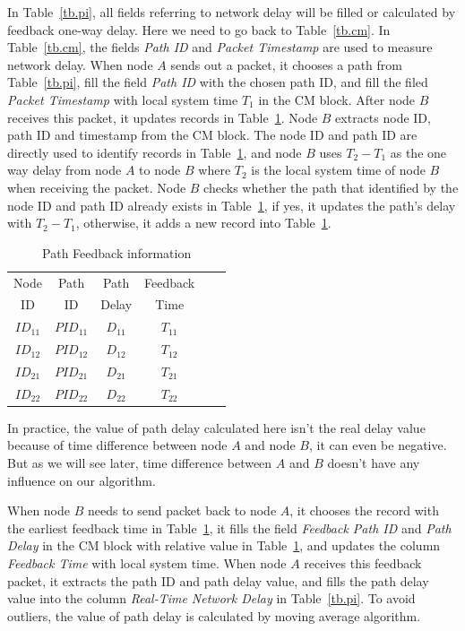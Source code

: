 In Table~\ref{tb.pi}, all fields referring to network delay will be filled or calculated by feedback one-way delay. Here we need to go back to Table~\ref{tb.cm}. In Table~\ref{tb.cm}, the fields \emph{Path ID} and \emph{Packet Timestamp} are used to measure network delay. When node $A$ sends out a packet, it chooses a path from Table~\ref{tb.pi}, fill the field \emph{Path ID} with the chosen path ID, and fill the filed \emph{Packet Timestamp} with local system time $T_1$ in the CM block. After node $B$ receives this packet, it updates records in Table~\ref{tb.ps}. Node $B$ extracts node ID, path ID and timestamp from the CM block. The node ID and path ID are directly used to identify records in Table~\ref{tb.ps}, and node $B$ uses $T_2-T_1$ as the one way delay from node $A$ to node $B$ where $T_2$ is the local system time of node $B$ when receiving the packet. Node $B$ checks whether the path that identified by the node ID and path ID already exists in Table~\ref{tb.ps}, if yes, it updates the path's delay with $T_2-T_1$, otherwise, it adds a new record into Table~\ref{tb.ps}.

\begin{table}[htbp]
\caption{\label{tb.ps}Path Feedback information}
\centering
\begin{tabular}{|c|c|c|c|c|c|}
\hline
 Node   & Path    & Path      & Feedback           \\
  ID    &  ID     & Delay     & Time               \\
\hline
${ID}_{11}$&${PID}_{11}$&${D}_{11}$&${T}_{11}$   \\
\hline
${ID}_{12}$&${PID}_{12}$&${D}_{12}$&${T}_{12}$   \\
\hline
${ID}_{21}$&${PID}_{21}$&${D}_{21}$&${T}_{21}$   \\
\hline
${ID}_{22}$&${PID}_{22}$&${D}_{22}$&${T}_{22}$   \\
\hline
\end{tabular}
\end{table}

In practice, the value of path delay calculated here isn't the real delay value because of time difference between node $A$ and node $B$, it can even be negative. But as we will see later, time difference between $A$ and $B$ doesn't have any influence on our algorithm.

When node $B$ needs to send packet back to node $A$, it chooses the record with the earliest feedback time in Table~\ref{tb.ps}, it fills the field \emph{Feedback Path ID} and \emph{Path Delay} in the CM block with relative value in Table~\ref{tb.ps}, and updates the column \emph{Feedback Time} with local system time. When node $A$ receives this feedback packet, it extracts the path ID and path delay value, and fills the path delay value into the column \emph{Real-Time Network Delay} in Table~\ref{tb.pi}. To avoid outliers, the value of path delay is calculated by moving average algorithm. 

